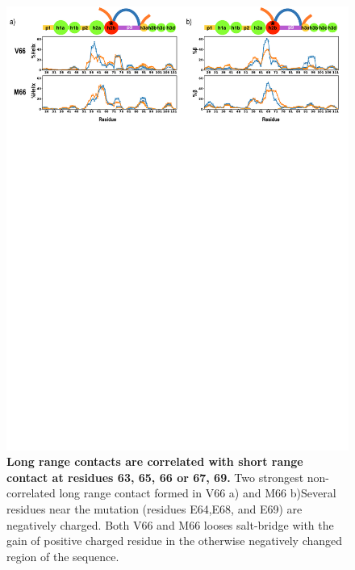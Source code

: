 \documentclass[journal=jacsat,manuscript=article]{achemso}
\begin{document}
\begin{figure}[!ht]
\includegraphics[scale=0.5,width=12cm,trim={0 0cm 0 0cm},clip]{../figures/fig6.pdf}
\caption{{\bf Long range contacts are correlated with short range contact at residues 63, 65, 66 or 67, 69.} Two strongest non-correlated long range contact formed in V66 a) and M66 b)Several residues near the mutation (residues E64,E68, and E69) are negatively charged. Both V66 and M66 looses salt-bridge with the gain of positive charged residue in the otherwise negatively changed region of the sequence. 
 }
\label{fig6}
\end{figure}
\end{document}
